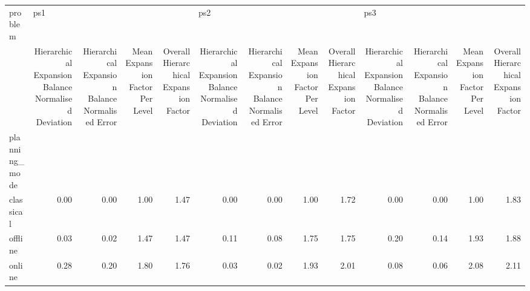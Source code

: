 \begin{tabular}{lrrrrrrrrrrrr}
\toprule
problem & \multicolumn{4}{l}{ps1} & \multicolumn{4}{l}{ps2} & \multicolumn{4}{l}{ps3} \\
{} & Hierarchical Expansion Balance Normalised Deviation & Hierarchical Expansion Balance Normalised Error & Mean Expansion Factor Per Level & Overall Hierarchical Expansion Factor & Hierarchical Expansion Balance Normalised Deviation & Hierarchical Expansion Balance Normalised Error & Mean Expansion Factor Per Level & Overall Hierarchical Expansion Factor & Hierarchical Expansion Balance Normalised Deviation & Hierarchical Expansion Balance Normalised Error & Mean Expansion Factor Per Level & Overall Hierarchical Expansion Factor \\
planning\_mode &                                                     &                                                 &                                 &                                       &                                                     &                                                 &                                 &                                       &                                                     &                                                 &                                 &                                       \\
\midrule
classical     &                                               0.00 &                                            0.00 &                            1.00 &                                  1.47 &                                               0.00 &                                            0.00 &                            1.00 &                                  1.72 &                                               0.00 &                                            0.00 &                            1.00 &                                  1.83 \\
offline       &                                               0.03 &                                            0.02 &                            1.47 &                                  1.47 &                                               0.11 &                                            0.08 &                            1.75 &                                  1.75 &                                               0.20 &                                            0.14 &                            1.93 &                                  1.88 \\
online        &                                               0.28 &                                            0.20 &                            1.80 &                                  1.76 &                                               0.03 &                                            0.02 &                            1.93 &                                  2.01 &                                               0.08 &                                            0.06 &                            2.08 &                                  2.11 \\
\bottomrule
\end{tabular}
